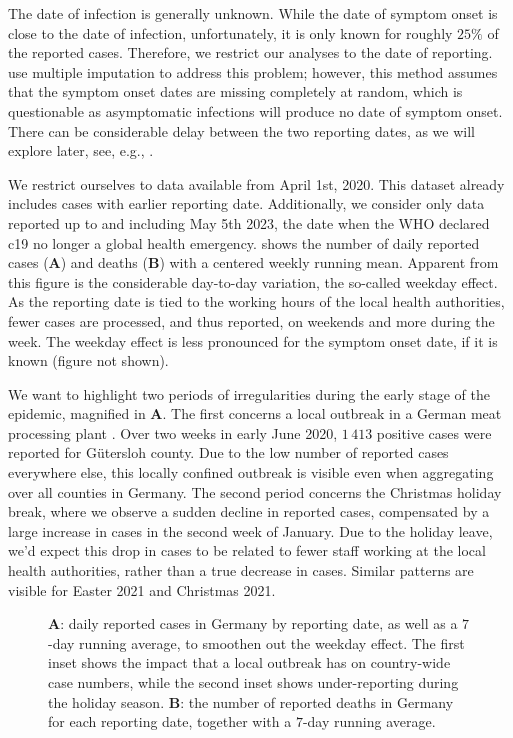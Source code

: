 The date of infection is generally unknown. While the date of symptom onset is close to the date of infection, unfortunately, it is only known for roughly $25\%$ of the reported cases. Therefore, we restrict our analyses to the date of reporting. \citet{AnDerHeiden2020Schatzung} use multiple imputation to address this problem; however, this method assumes that the symptom onset dates are missing completely at random, which is questionable as asymptomatic infections will produce no date of symptom onset. There can be considerable delay between the two reporting dates, as we will explore later, see, e.g., .

We restrict ourselves to data available from April 1st, 2020. This dataset already includes cases with earlier reporting date. Additionally, we consider only data reported up to and including May 5th 2023, the date when the WHO declared \gls{c19} no longer a global health emergency.  shows the number of daily reported cases (\textbf{A}) and deaths (\textbf{B}) with a centered weekly running mean. Apparent from this figure is the considerable day-to-day variation, the so-called weekday effect. As the reporting date is tied to the working hours of the local health authorities, fewer cases are processed, and thus reported, on weekends and more during the week. The weekday effect is less pronounced for the symptom onset date, if it is known (figure not shown). 

We want to highlight two periods of irregularities during the early stage of the epidemic, magnified in  \textbf{A}. The first concerns a local outbreak in a German meat processing plant \citep{Gunther2020SARSCoV2}. Over two weeks in early June 2020, $1\,413$ positive cases were reported for Gütersloh county. Due to the low number of reported cases everywhere else, this locally confined outbreak is visible even when aggregating over all counties in Germany. 
The second period concerns the Christmas holiday break, where we observe a sudden decline in reported cases, compensated by a large increase in cases in the second week of January. Due to the holiday leave, we'd expect this drop in cases to be related to fewer staff working at the local health authorities, rather than a true decrease in cases. Similar patterns are visible for Easter 2021 and Christmas 2021. 

\begin{figure}
    \resizebox{\textwidth}{!}{%
    }
    \caption{\textbf{A}: daily reported cases in Germany by reporting date, as well as a $7$-day running average, to smoothen out the weekday effect. The first inset shows the impact that a local outbreak \citep{Gunther2020SARSCoV2} has on country-wide case numbers, while the second inset shows under-reporting during the holiday season.  \textbf{B}: the number of reported deaths in Germany for each reporting date, together with a $7$-day running average.}
    \label{fig:cases_germany}
\end{figure}



